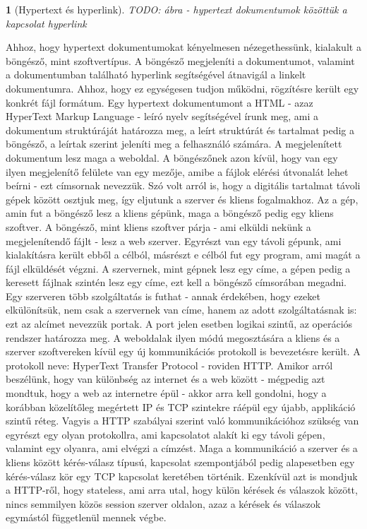 \documentclass[a4paper, 12pt, oneside]{article}
\newtheorem*{defin}{}
\begin{document}
\begin{center}
\begin{defin}[Hypertext és hyperlink]
TODO: ábra - hypertext dokumentumok közöttük a kapcsolat hyperlink
\end{defin}
\end{center}

Ahhoz, hogy hypertext dokumentumokat kényelmesen nézegethessünk, kialakult a böngésző, mint szoftvertípus. A böngésző megjeleníti a dokumentumot, valamint a dokumentumban található hyperlink segítségével átnavigál a linkelt dokumentumra. Ahhoz, hogy ez egységesen tudjon működni, rögzítésre került egy konkrét fájl formátum. Egy hypertext dokumentumont a HTML - azaz HyperText Markup Language - leíró nyelv segítségével írunk meg, ami a dokumentum struktúráját határozza meg, a leírt struktúrát és tartalmat pedig a böngésző, a leírtak szerint jeleníti meg a felhasználó számára. A megjelenített dokumentum lesz maga a weboldal. A böngészőnek azon kívül, hogy van egy ilyen megjelenítő felülete van egy mezője, amibe a fájlok elérési útvonalát lehet beírni - ezt címsornak nevezzük.
\bigbreak
Szó volt arról is, hogy a digitális tartalmat távoli gépek között osztjuk meg, így eljutunk a szerver és kliens fogalmakhoz. Az a gép, amin fut a böngésző lesz a kliens gépünk, maga a böngésző pedig egy kliens szoftver. A böngésző, mint kliens szoftver párja - ami elküldi nekünk a megjelenítendő fájlt - lesz a web szerver. Egyrészt van egy távoli gépunk, ami kialakításra került ebből a célból, másrészt e célból fut egy program, ami magát a fájl elküldését végzni. A szervernek, mint gépnek lesz egy címe, a gépen pedig a keresett fájlnak szintén lesz egy címe, ezt kell a böngésző címsorában megadni. Egy szerveren több szolgáltatás is futhat - annak érdekében, hogy ezeket elkülönítsük, nem csak a szervernek van címe, hanem az adott szolgáltatásnak is: ezt az alcímet nevezzük portak. A port jelen esetben logikai szintű, az operációs rendszer határozza meg.
\bigbreak
A weboldalak ilyen módú megosztására a kliens és a szerver szoftvereken kívül egy új kommunikációs protokoll is bevezetésre került. A protokoll neve: HyperText Transfer Protocol - roviden HTTP. Amikor arról beszélünk, hogy van különbség az internet és a web között - mégpedig azt mondtuk, hogy a web az internetre épül - akkor arra kell gondolni, hogy a korábban közelítőleg megértett IP és TCP szintekre ráépül egy újabb, applikáció szintű réteg. Vagyis a HTTP szabályai szerint való kommunikációhoz szükség van egyrészt egy olyan protokollra, ami kapcsolatot alakít ki egy távoli gépen, valamint egy olyanra, ami elvégzi a címzést. Maga a kommunikáció a szerver és a kliens között kérés-válasz típusú, kapcsolat szempontjából pedig alapesetben egy kérés-válasz kör egy TCP kapcsolat keretében történik. Ezenkívül azt is mondjuk a HTTP-ről, hogy stateless, ami arra utal, hogy külön kérések és válaszok között, nincs semmilyen közös session szerver oldalon, azaz a kérések és válaszok egymástól függetlenül mennek végbe.
\end{document}
